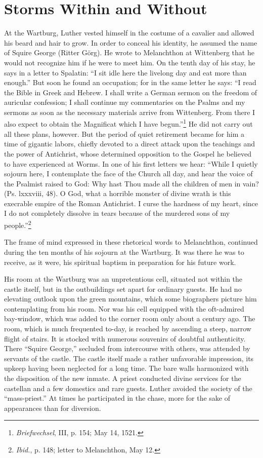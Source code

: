 \section{Storms Within and Without}

At the Wartburg, Luther vested himself in the costume of a
cavalier and allowed his beard and hair to grow. In order to conceal
his identity, he assumed the name of Squire George (Ritter Görg).
He wrote to Melanchthon at Wittenberg that he would not recognize
him if he were to meet him. On the tenth day of his stay, he says
in a letter to Spalatin: “I sit idle here the livelong day and eat more
than enough.” But soon he found an occupation; for in the same
letter he says: “I read the Bible in Greek and Hebrew. I shall write
a German sermon on the freedom of auricular confession; I shall
continue my commentaries on the Psalms and my sermons as soon
as the necessary materials arrive from Wittenberg. From there I also
expect to obtain the Magnificat which I have begun.”\footnote{\textit{Briefwechsel}, III, p. 154; May 14, 1521.}
He did
not carry out all these plans, however. But the period of quiet retirement
became for him a time of gigantic labors, chiefly devoted to
a direct attack upon the teachings and the power of Antichrist,
whose determined opposition to the Gospel he believed to have experienced
at Worms. In one of his first letters we hear: “While I
quietly sojourn here, I contemplate the face of the Church all day,
and hear the voice of the Psalmist raised to God: Why hast Thou
made all the children of men in vain? (Ps. lxxxviii, 48). O God,
what a horrible monster of divine wrath is this execrable empire of
the Roman Antichrist. I curse the hardness of my heart, since I
do not completely dissolve in tears because of the murdered sons of
my people.”\footnote{\textit{Ibid.}, p. 148; letter to Melanchthon, May 12.}

The frame of mind expressed in these rhetorical words to Melanchthon,
continued during the ten months of his sojourn at the
Wartburg. It was there he was to receive, as it were, his spiritual
baptism in preparation for his future work.

His room at the Wartburg was an unpretentious cell, situated not
within the castle itself, but in the outbuildings set apart for ordinary
guests. He had no elevating outlook upon the green mountains,
which some biographers picture him contemplating from his room.
Nor was his cell equipped with the oft-admired bay-window, which
was added to the corner room only about a century ago. The room,
which is much frequented to-day, is reached by ascending a steep,
narrow flight of stairs. It is stocked with numerous souvenirs of
doubtful authenticity. There “Squire George,” secluded from intercourse
with others, was attended by servants of the castle. The castle
itself made a rather unfavorable impression, its upkeep having
been neglected for a long time. The bare walls harmonized with the
disposition of the new inmate. A priest conducted divine services for
the castellan and a few domestics and rare guests. Luther avoided the
society of the “mass-priest.” At times he participated in the chase,
more for the sake of appearances than for diversion.

